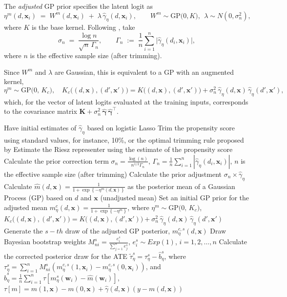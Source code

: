 The \emph{adjusted} GP prior specifies the latent logit as
\[
\eta^m(d,\mathbf{x}_i)
\;=\;
W^m(d,\mathbf{x}_i)\;+\;\lambda\,\widehat{\gamma}_\eta(d,\mathbf{x}_i),
\qquad
W^m \sim \mathrm{GP}\!\big(0, K\big),\ \ \lambda \sim N(0,\sigma_n^2),
\]
where $K$ is the base kernel. Following \cite{breunig2025double},
take
\[
\sigma_n \;=\; \frac{\log n}{\sqrt{n}\,\Gamma_n},
\qquad
\Gamma_n \;:=\; \frac{1}{n}\sum_{i=1}^n
\big|\widehat{\gamma}_\eta(d_i,\mathbf{x}_i)\big|,
\]
where $n$ is the effective sample size (after trimming).

Since $W^m$ and $\lambda$ are Gaussian, this is equivalent to a GP with
an augmented kernel,
\[
\eta^m \sim \mathrm{GP}\!\big(0,\, K_c\big),
\quad
K_c\big((d,\mathbf{x}),(d',\mathbf{x}')\big)
= K\big((d,\mathbf{x}),(d',\mathbf{x}')\big)
+ \sigma_n^2\,\widehat{\gamma}_\eta(d,\mathbf{x})\,
\widehat{\gamma}_\eta(d',\mathbf{x}'),
\]
which, for the vector of latent logits evaluated at the training inputs,
corresponds to the covariance matrix
$\mathbf{K} + \sigma_n^2\,\widehat{\boldsymbol{\gamma}}\,
\widehat{\boldsymbol{\gamma}}^{\top}$. 

\begin{algorithm}[h!]
	\caption{Double Robust Bayesian Algorithm}\label{Alg:DRBayes}
	\begin{algorithmic}[1]
		\State Have initial estimates of $\hat{\gamma}_{\eta}$ based on logistic Lasso
		\State Trim the propensity score using standard values, for instance, 10\%, or the optimal trimming rule proposed by \cite{Crump2009Overlap}
		\State Estimate the Riesz representer using the estimate of the propensity score 
		\State Calculate the prior correction term $\sigma_n=\frac{\log(n)}{n^{1/2}\Gamma_n}$, $\Gamma_n=\frac{1}{n}\sum_{i=1}^n |\hat{\gamma}_{\eta}(d_i,\mathbf{x}_i)|$, $n$ is the effective sample size (after trimming)
		\State Calculate the prior adjustment $\sigma_n\times \hat{\gamma}_{\eta}$ 
		\State Calculate $\hat{m}(d,\mathbf{x})=\frac{1}{1+\exp\left\{-\eta^m(d,\mathbf{x})\right\}}$ as the posterior mean of a Gaussian Process (GP) based on $d$ and $\mathbf{x}$ (unadjusted mean)
		\State Set an initial GP prior for  the adjusted mean $m_{\eta}^c(d,\mathbf{x})=\frac{1}{1+\exp\left\{-\eta^m\right\}}$, where $\eta^m \sim \mathrm{GP}\!\big(0,\, K_c\big)$, $K_c\big((d,\mathbf{x}),(d',\mathbf{x}')\big)
		= K\big((d,\mathbf{x}),(d',\mathbf{x}')\big)
		+ \sigma_n^2\,\widehat{\gamma}_\eta(d,\mathbf{x})\,
		\widehat{\gamma}_\eta(d',\mathbf{x}')$ 		 			
		\State Generate the $s-th$ draw of the adjusted GP posterior, $m_{\eta}^{c,s}(d,\mathbf{x})$
		\State Draw Bayesian bootstrap weights $M^s_{ni}=\frac{e_i^s}{\sum_{j=1}^n e_j^s}$, $e_i^s\sim Exp(1)$, $i=1,2,\dots,n$
		\State Calculate the corrected posterior draw for the ATE $\tilde{\tau}_{\eta}^s=\tau_{\eta}^s-\hat{b}_{\eta}^s$, where $\tau_{\eta}^s=\sum_{i=1}^n M^s_{ni}(m_{\eta}^{c,s}(1,\mathbf{x}_i)-m_{\eta}^{c,s}(0,\mathbf{x}_i))$, and $\hat{b}_{\eta}^s=\frac{1}{n}\sum_{i=1}^n\tau[m_{\eta}^s(\mathbf{w}_i)-\hat{m}(\mathbf{w}_i)]$, $\tau[m]=m(1,\mathbf{x})-m(0,\mathbf{x})+\hat{\gamma}(d,\mathbf{x})(y-m(d,\mathbf{x}))$ 
		\EndFor 
	\end{algorithmic} 
\end{algorithm}      
 
